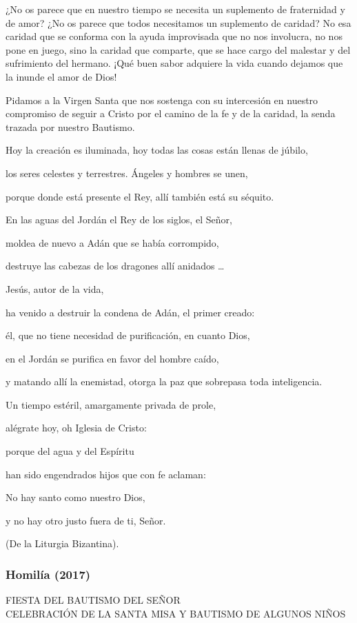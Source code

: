 {¿No os parece que en nuestro tiempo se necesita un suplemento de fraternidad y de amor? ¿No os parece que todos necesitamos un suplemento de caridad? No esa caridad que se conforma con la ayuda improvisada que no nos involucra, no nos pone en juego, sino la caridad que comparte, que se hace cargo del malestar y del sufrimiento del hermano. ¡Qué buen sabor adquiere la vida cuando dejamos que la inunde el amor de Dios!

Pidamos a la Virgen Santa que nos sostenga con su intercesión en nuestro compromiso de seguir a Cristo por el camino de la fe y de la caridad, la senda trazada por nuestro Bautismo.

Hoy la creación es iluminada, hoy todas las cosas están llenas de júbilo,

los seres celestes y terrestres. Ángeles y hombres se unen,

porque donde está presente el Rey, allí también está su séquito.

En las aguas del Jordán el Rey de los siglos, el Señor,

moldea de nuevo a Adán que se había corrompido,

destruye las cabezas de los dragones allí anidados \ldots{}

Jesús, autor de la vida,

ha venido a destruir la condena de Adán, el primer creado:

él, que no tiene necesidad de purificación, en cuanto Dios,

en el Jordán se purifica en favor del hombre caído,

y matando allí la enemistad, otorga la paz que sobrepasa toda inteligencia.

Un tiempo estéril, amargamente privada de prole,

alégrate hoy, oh Iglesia de Cristo:

porque del agua y del Espíritu

han sido engendrados hijos que con fe aclaman:

No hay santo como nuestro Dios,

y no hay otro justo fuera de ti, Señor.

(De la Liturgia Bizantina).

\subsubsection{Homilía (2017)} FIESTA DEL BAUTISMO DEL SEÑOR\\ CELEBRACIÓN DE LA SANTA MISA Y BAUTISMO DE ALGUNOS NIÑOS

}
